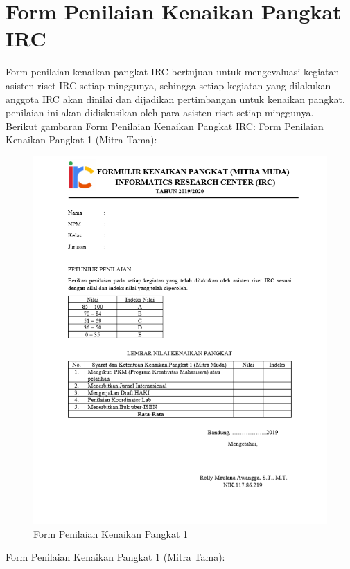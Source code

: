 \chapter{Form Penilaian Kenaikan Pangkat IRC}
\par
Form penilaian kenaikan pangkat IRC bertujuan untuk mengevaluasi kegiatan asisten riset IRC setiap minggunya, sehingga setiap kegiatan yang dilakukan anggota IRC akan dinilai dan dijadikan pertimbangan untuk kenaikan pangkat. penilaian ini akan didiskusikan oleh para asisten riset setiap minggunya.\\
Berikut gambaran Form Penilaian Kenaikan Pangkat IRC:
Form Penilaian Kenaikan Pangkat 1 (Mitra Tama):
\begin{figure}[H]
        \centerline{\includegraphics[scale=0.8]{figures/pangkat1}}
        \caption{Form Penilaian Kenaikan Pangkat 1}
		\label{pangkat1}
\end{figure}
Form Penilaian Kenaikan Pangkat 1 (Mitra Tama):
